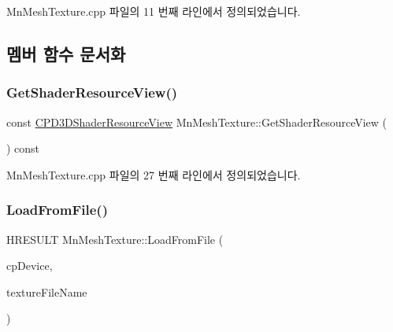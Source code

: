Mn\+Mesh\+Texture.\+cpp 파일의 11 번째 라인에서 정의되었습니다.



\subsection{멤버 함수 문서화}
\mbox{\label{class_m_n_l_1_1_mn_mesh_texture_a98696085fe42950f2bf6eb4e508cdcb7}} 
\subsubsection{\texorpdfstring{Get\+Shader\+Resource\+View()}{GetShaderResourceView()}}
{\footnotesize\ttfamily const \hyperlink{namespace_m_n_l_a93794d93663474ff79c950ed985565aa}{C\+P\+D3\+D\+Shader\+Resource\+View} Mn\+Mesh\+Texture\+::\+Get\+Shader\+Resource\+View (\begin{DoxyParamCaption}{ }\end{DoxyParamCaption}) const}



Mn\+Mesh\+Texture.\+cpp 파일의 27 번째 라인에서 정의되었습니다.

\mbox{\label{class_m_n_l_1_1_mn_mesh_texture_acd57364c25a3304f5f80cdd2f2ff310d}} 
\subsubsection{\texorpdfstring{Load\+From\+File()}{LoadFromFile()}}
{\footnotesize\ttfamily H\+R\+E\+S\+U\+LT Mn\+Mesh\+Texture\+::\+Load\+From\+File (\begin{DoxyParamCaption}\item[{const \hyperlink{namespace_m_n_l_a1eec210db8f309a4a9ac0d9658784c31}{C\+P\+D3\+D\+Device} \&}]{cp\+Device,  }\item[{const std\+::wstring \&}]{texture\+File\+Name }\end{DoxyParamCaption})}



